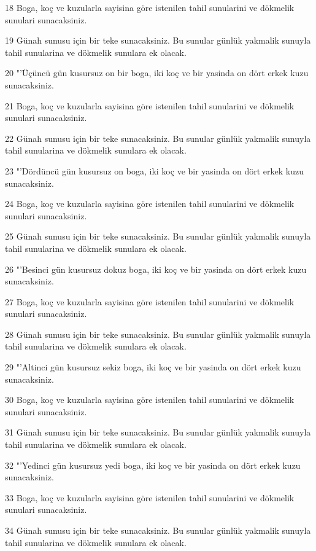 \par 18 Boga, koç ve kuzularla sayisina göre istenilen tahil sunularini ve dökmelik sunulari sunacaksiniz.
\par 19 Günah sunusu için bir teke sunacaksiniz. Bu sunular günlük yakmalik sunuyla tahil sunularina ve dökmelik sunulara ek olacak.
\par 20 "'Üçüncü gün kusursuz on bir boga, iki koç ve bir yasinda on dört erkek kuzu sunacaksiniz.
\par 21 Boga, koç ve kuzularla sayisina göre istenilen tahil sunularini ve dökmelik sunulari sunacaksiniz.
\par 22 Günah sunusu için bir teke sunacaksiniz. Bu sunular günlük yakmalik sunuyla tahil sunularina ve dökmelik sunulara ek olacak.
\par 23 "'Dördüncü gün kusursuz on boga, iki koç ve bir yasinda on dört erkek kuzu sunacaksiniz.
\par 24 Boga, koç ve kuzularla sayisina göre istenilen tahil sunularini ve dökmelik sunulari sunacaksiniz.
\par 25 Günah sunusu için bir teke sunacaksiniz. Bu sunular günlük yakmalik sunuyla tahil sunularina ve dökmelik sunulara ek olacak.
\par 26 "'Besinci gün kusursuz dokuz boga, iki koç ve bir yasinda on dört erkek kuzu sunacaksiniz.
\par 27 Boga, koç ve kuzularla sayisina göre istenilen tahil sunularini ve dökmelik sunulari sunacaksiniz.
\par 28 Günah sunusu için bir teke sunacaksiniz. Bu sunular günlük yakmalik sunuyla tahil sunularina ve dökmelik sunulara ek olacak.
\par 29 "'Altinci gün kusursuz sekiz boga, iki koç ve bir yasinda on dört erkek kuzu sunacaksiniz.
\par 30 Boga, koç ve kuzularla sayisina göre istenilen tahil sunularini ve dökmelik sunulari sunacaksiniz.
\par 31 Günah sunusu için bir teke sunacaksiniz. Bu sunular günlük yakmalik sunuyla tahil sunularina ve dökmelik sunulara ek olacak.
\par 32 "'Yedinci gün kusursuz yedi boga, iki koç ve bir yasinda on dört erkek kuzu sunacaksiniz.
\par 33 Boga, koç ve kuzularla sayisina göre istenilen tahil sunularini ve dökmelik sunulari sunacaksiniz.
\par 34 Günah sunusu için bir teke sunacaksiniz. Bu sunular günlük yakmalik sunuyla tahil sunularina ve dökmelik sunulara ek olacak.
